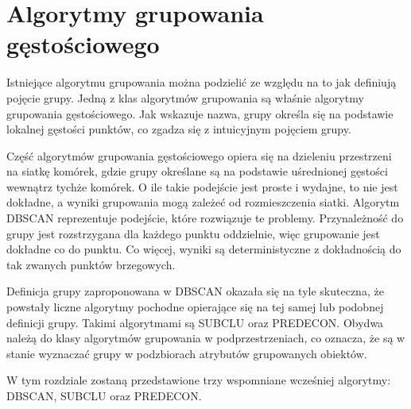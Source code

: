 \chapter{Algorytmy grupowania gęstościowego}

Istniejące algorytmu grupowania można podzielić ze względu na to jak definiują pojęcie grupy. Jedną z klas algorytmów grupowania są właśnie algorytmy grupowania gęstościowego. Jak wskazuje nazwa, grupy określa się na podstawie lokalnej gęstości punktów, co zgadza się z intuicyjnym pojęciem grupy.\par

Część algorytmów grupowania gęstościowego opiera się na dzieleniu przestrzeni na siatkę komórek, gdzie grupy określane są na podstawie uśrednionej gęstości wewnątrz tychże komórek. O ile takie podejście jest proste i wydajne, to nie jest dokładne, a wyniki grupowania mogą zależeć od rozmieszczenia siatki. Algorytm DBSCAN reprezentuje podejście, które rozwiązuje te problemy. Przynależność do grupy jest rozstrzygana dla każdego punktu oddzielnie, więc grupowanie jest dokładne co do punktu. Co więcej, wyniki są deterministyczne z dokładnością do tak zwanych punktów brzegowych.\par
Definicja grupy zaproponowana w DBSCAN okazała się na tyle skuteczna, że powstały liczne algorytmy pochodne opierające się na tej samej lub podobnej definicji grupy. Takimi algorytmami są SUBCLU oraz PREDECON. Obydwa należą do klasy algorytmów grupowania w podprzestrzeniach, co oznacza, że są w stanie wyznaczać grupy w podzbiorach atrybutów grupowanych obiektów.\par
W tym rozdziale zostaną przedstawione trzy wspomniane wcześniej algorytmy: DBSCAN, SUBCLU oraz PREDECON.



